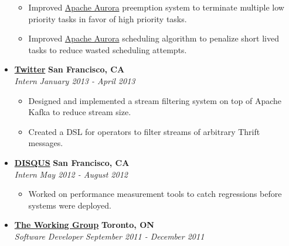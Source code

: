 \documentclass[10pt,letterpaper]{article}
\begin{document}
\begin{itemize}
    \begin{itemize}[label=\textbullet]
      \itemsep0em
      \item Improved \href{aurora.apache.org}{Apache Aurora}
        preemption system to terminate multiple low priority tasks in favor of
        high priority tasks.
      \item Improved \href{aurora.apache.org}{Apache Aurora}
        scheduling algorithm to penalize short lived tasks to reduce wasted
        scheduling attempts.
    \end{itemize}

    \item[]
    {\href{http://www.twitter.com}{\textbf{Twitter}} \hfill
      \textbf{San Francisco, CA}}
    \\
    {\emph{Intern} \hfill \emph{January 2013 - April 2013}}

    \begin{itemize}[label=\textbullet]
      \itemsep0em
      \item Designed and implemented a stream filtering system on top of Apache
        Kafka to reduce stream size.
      \item Created a DSL for operators to filter streams of arbitrary Thrift
        messages.
    \end{itemize}

    \item[]
    {\href{http://www.disqus.com}{\textbf{DISQUS}} \hfill
      \textbf{San Francisco, CA}}
    \\
    {\emph{Intern} \hfill \emph{May 2012 - August 2012}}

    \begin{itemize}[label=\textbullet]
      \itemsep0em
      \item Worked on performance measurement tools to catch regressions before
        systems were deployed.
    \end{itemize}


    \item[]
    {\href{http://www.twg.ca}{\textbf{The Working Group}} \hfill
      \textbf{Toronto, ON}}
    \\
    {\emph{Software Developer} \hfill \emph{September 2011 - December 2011}}


\end{itemize}
\end{document}

